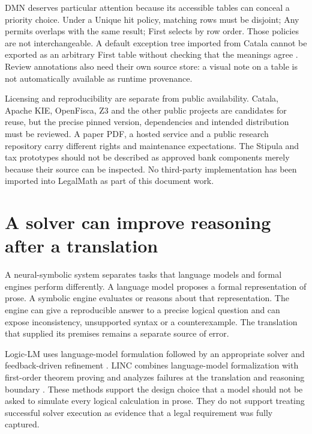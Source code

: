 \documentclass[12pt,a4paper,oneside,openany]{book}
\begin{document}
DMN deserves particular attention because its accessible tables can conceal a
priority choice. Under a Unique hit policy, matching rows must be disjoint; Any
permits overlaps with the same result; First selects by row order. Those policies
are not interchangeable. A default exception tree imported from Catala cannot be
exported as an arbitrary First table without checking that the meanings agree
\citep[sec.~8.2.11]{dmn2024}. Review annotations also need their own source store:
a visual note on a table is not automatically available as runtime provenance.

Licensing and reproducibility are separate from public availability. Catala,
Apache KIE, OpenFisca, Z3 and the other public projects are candidates for reuse,
but the precise pinned version, dependencies and intended distribution must be
reviewed. A paper PDF, a hosted service and a public research repository carry
different rights and maintenance expectations. The Stipula and tax prototypes
should not be described as approved bank components merely because their source
can be inspected. No third-party implementation has been imported into LegalMath
as part of this document work.

\section{A solver can improve reasoning after a translation}
\label{merge:M04:10}

\label{sec:languages-neurosymbolic}
A neural-symbolic system separates tasks that language models and formal
engines perform differently. A language model proposes a formal representation
of prose. A symbolic engine evaluates or reasons about that representation.
The engine can give a reproducible answer to a precise logical question and
can expose inconsistency, unsupported syntax or a counterexample. The
translation that supplied its premises remains a separate source of error.

Logic-LM uses language-model formulation followed by an appropriate solver and
feedback-driven refinement \citep[sec.~3 and prompt appendices]{logiclm2023}.
LINC combines language-model formalization with first-order theorem proving
and analyzes failures at the translation and reasoning boundary
\citep[method and error analysis]{linc2023}. These methods support the design
choice that a model should not be asked to simulate every logical calculation
in prose. They do not support treating successful solver execution as evidence
that a legal requirement was fully captured.
\end{document}

